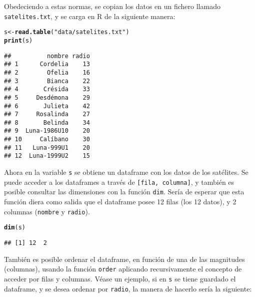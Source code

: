 \documentclass[12pt]{report}\usepackage[]{graphicx}\usepackage[dvipsnames]{xcolor}
\makeatletter
\newcommand{\hlstr}[1]{\textcolor[rgb]{0.192,0.494,0.8}{#1}}%
\newcommand{\hlstd}[1]{\textcolor[rgb]{0.345,0.345,0.345}{#1}}%
\newcommand{\hlkwb}[1]{\textcolor[rgb]{0.69,0.353,0.396}{#1}}%
\newcommand{\hlkwd}[1]{\textcolor[rgb]{0.737,0.353,0.396}{\textbf{#1}}}%
\newenvironment{kframe}{%
 \def\at@end@of@kframe{}%
 \ifinner\ifhmode%
  \def\at@end@of@kframe{\end{minipage}}%
  \begin{minipage}{\columnwidth}%
 \fi\fi%
 \def\FrameCommand##1{\hskip\@totalleftmargin \hskip-\fboxsep
 \colorbox{shadecolor}{##1}\hskip-\fboxsep
     \hskip-\linewidth \hskip-\@totalleftmargin \hskip\columnwidth}%
 \MakeFramed {\advance\hsize-\width
   \@totalleftmargin\z@ \linewidth\hsize
   \@setminipage}}%
 {\par\unskip\endMakeFramed%
 \at@end@of@kframe}
\newenvironment{knitrout}{}{} %
\makeatother
\begin{document}
			Obedeciendo a estas normas, se copian los datos en un fichero llamado \texttt{satelites.txt}, y se carga en R de la siguiente manera:
			
\begin{knitrout}
\color{fgcolor}\begin{kframe}
\begin{alltt}
\hlstd{s} \hlkwb{<-} \hlkwd{read.table}\hlstd{(}\hlstr{"data/satelites.txt"}\hlstd{)}
\hlkwd{print}\hlstd{(s)}
\end{alltt}
\begin{verbatim}
##          nombre radio
## 1      Cordelia    13
## 2        Ofelia    16
## 3        Bianca    22
## 4       Crésida    33
## 5     Desdémona    29
## 6       Julieta    42
## 7     Rosalinda    27
## 8       Belinda    34
## 9  Luna-1986U10    20
## 10     Calíbano    30
## 11   Luna-999U1    20
## 12  Luna-1999U2    15
\end{verbatim}
\end{kframe}
\end{knitrout}
			
			Ahora en la variable \texttt{s} se obtiene un dataframe con los datos de los satélites. Se puede acceder a los dataframes a través de \texttt{[fila, columna]}, y también es posible consultar las dimensiones con la función \texttt{dim}. Sería de esperar que esta función diera como salida que el dataframe posee 12 filas (los 12 datos), y 2 columnas (\texttt{nombre} y \texttt{radio}).
			
\begin{knitrout}
\color{fgcolor}\begin{kframe}
\begin{alltt}
\hlkwd{dim}\hlstd{(s)}
\end{alltt}
\begin{verbatim}
## [1] 12  2
\end{verbatim}
\end{kframe}
\end{knitrout}
			
			También es posible ordenar el dataframe, en función de una de las magnitudes (columnas), usando la función \texttt{order} aplicando recursivamente el concepto de acceder por filas y columnas. Véase un ejemplo, si en \texttt{s} se tiene guardado el dataframe, y se desea ordenar por \texttt{radio}, la manera de hacerlo sería la siguiente: 
			
\end{document}
